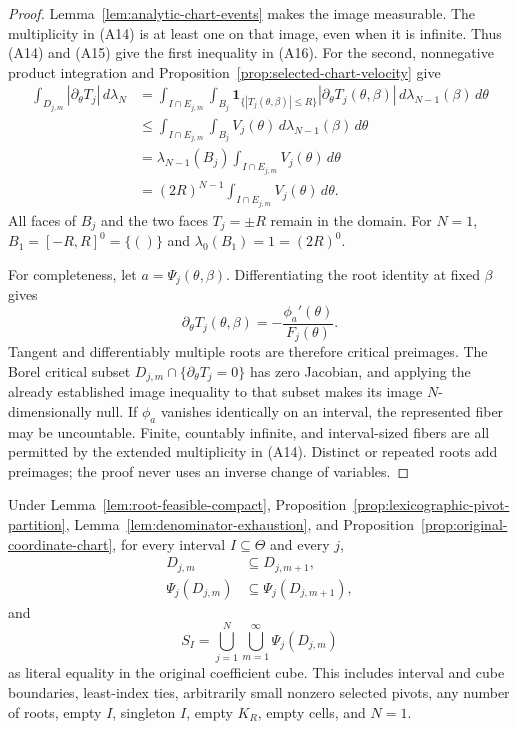 \begin{proof}
Lemma~\ref{lem:analytic-chart-events} makes the image measurable.  The
multiplicity in \textup{(A14)} is at least one on that image, even when it
is infinite.  Thus \textup{(A14)} and \textup{(A15)} give the first
inequality in \textup{(A16)}.  For the second, nonnegative product
integration and Proposition~\ref{prop:selected-chart-velocity} give
\[
\begin{aligned}
\int_{D_{j,m}}|\partial_\theta T_j|\,d\lambda_N
&=\int_{I\cap E_{j,m}}\int_{B_j}
 \mathbf 1_{\{|T_j(\theta,\beta)|\leq R\}}
 |\partial_\theta T_j(\theta,\beta)|
 \,d\lambda_{N-1}(\beta)\,d\theta\\
&\leq\int_{I\cap E_{j,m}}\int_{B_j}V_j(\theta)
 \,d\lambda_{N-1}(\beta)\,d\theta\\
&=\lambda_{N-1}(B_j)
 \int_{I\cap E_{j,m}}V_j(\theta)\,d\theta\\
&=(2R)^{N-1}\int_{I\cap E_{j,m}}V_j(\theta)\,d\theta.
\end{aligned}
\tag{A20}
\]
All faces of $B_j$ and the two faces $T_j=\pm R$ remain in the domain.
For $N=1$, $B_1=[-R,R]^0=\{()\}$ and
$\lambda_0(B_1)=1=(2R)^0$.

For completeness, let $a=\Psi_j(\theta,\beta)$.  Differentiating the root
identity at fixed $\beta$ gives
\[
\partial_\theta T_j(\theta,\beta)
=-\frac{\phi_a'(\theta)}{F_j(\theta)}.
\tag{A21}
\]
Tangent and differentiably multiple roots are therefore critical
preimages.  The Borel critical subset
$D_{j,m}\cap\{\partial_\theta T_j=0\}$ has zero Jacobian, and applying the
already established image inequality to that subset makes its image
$N$-dimensionally null.  If $\phi_a$ vanishes identically on an interval,
the represented fiber may be uncountable.  Finite, countably infinite, and
interval-sized fibers are all permitted by the extended multiplicity in
\textup{(A14)}.  Distinct or repeated roots add preimages; the proof never
uses an inverse change of variables.
\end{proof}

\begin{lemma}
\label{lem:exact-root-event-coverage}
Under Lemma~\ref{lem:root-feasible-compact},
Proposition~\ref{prop:lexicographic-pivot-partition},
Lemma~\ref{lem:denominator-exhaustion}, and
Proposition~\ref{prop:original-coordinate-chart}, for every interval
$I\subseteq\Theta$ and every $j$,
\[
\begin{aligned}
D_{j,m}&\subseteq D_{j,m+1},\\
\Psi_j(D_{j,m})&\subseteq\Psi_j(D_{j,m+1}),
\end{aligned}
\tag{A22}
\]
and
\[
S_I=\bigcup_{j=1}^N\bigcup_{m=1}^\infty\Psi_j(D_{j,m})
\tag{A23}
\]
as literal equality in the original coefficient cube.  This includes
interval and cube boundaries, least-index ties, arbitrarily small nonzero
selected pivots, any number of roots, empty $I$, singleton $I$, empty
$K_R$, empty cells, and $N=1$.
\end{lemma}

